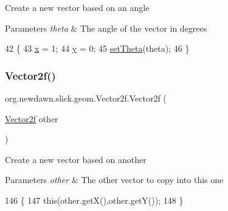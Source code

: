 Create a new vector based on an angle


\begin{DoxyParams}{Parameters}
{\em theta} & The angle of the vector in degrees \\
\hline
\end{DoxyParams}

\begin{DoxyCode}
42                                   \{
43         \mbox{\hyperlink{classorg_1_1newdawn_1_1slick_1_1geom_1_1_vector2f_a3c72cdf13ebc511a472e1a02002fa579}{x}} = 1;
44         \mbox{\hyperlink{classorg_1_1newdawn_1_1slick_1_1geom_1_1_vector2f_aa03914f0c3d32063aa90e5bd7b74688e}{y}} = 0;
45         \mbox{\hyperlink{classorg_1_1newdawn_1_1slick_1_1geom_1_1_vector2f_aa6922f08881bf7465883171ab2f8a61a}{setTheta}}(theta);
46     \}
\end{DoxyCode}
\mbox{\label{classorg_1_1newdawn_1_1slick_1_1geom_1_1_vector2f_ae6d4e81bed40c702eed87e575a9a20a3}} 
\subsubsection{\texorpdfstring{Vector2f()}{Vector2f()}\hspace{0.1cm}{\footnotesize\ttfamily [4/5]}}
{\footnotesize\ttfamily org.\+newdawn.\+slick.\+geom.\+Vector2f.\+Vector2f (\begin{DoxyParamCaption}\item[{\mbox{\hyperlink{classorg_1_1newdawn_1_1slick_1_1geom_1_1_vector2f}{Vector2f}}}]{other }\end{DoxyParamCaption})\hspace{0.3cm}{\ttfamily [inline]}}

Create a new vector based on another


\begin{DoxyParams}{Parameters}
{\em other} & The other vector to copy into this one \\
\hline
\end{DoxyParams}

\begin{DoxyCode}
146                                     \{
147         \textcolor{keyword}{this}(other.getX(),other.getY());
148     \}
\end{DoxyCode}
\mbox{\label{classorg_1_1newdawn_1_1slick_1_1geom_1_1_vector2f_a3380e8a5517968e81695bdd51db256e2}} 
